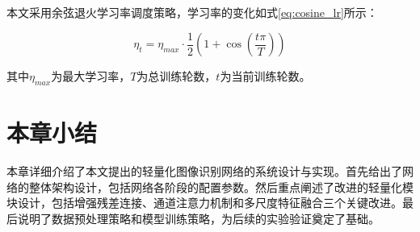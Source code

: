 本文采用余弦退火学习率调度策略，学习率的变化如式\eqref{eq:cosine_lr}所示：

\begin{equation}
    \eta_t = \eta_{max} \cdot \frac{1}{2} \left(1 + \cos\left(\frac{t \pi}{T}\right)\right)
    \label{eq:cosine_lr}
\end{equation}

其中$\eta_{max}$为最大学习率，$T$为总训练轮数，$t$为当前训练轮数。

\section{本章小结}

本章详细介绍了本文提出的轻量化图像识别网络的系统设计与实现。首先给出了网络的整体架构设计，包括网络各阶段的配置参数。然后重点阐述了改进的轻量化模块设计，包括增强残差连接、通道注意力机制和多尺度特征融合三个关键改进。最后说明了数据预处理策略和模型训练策略，为后续的实验验证奠定了基础。
